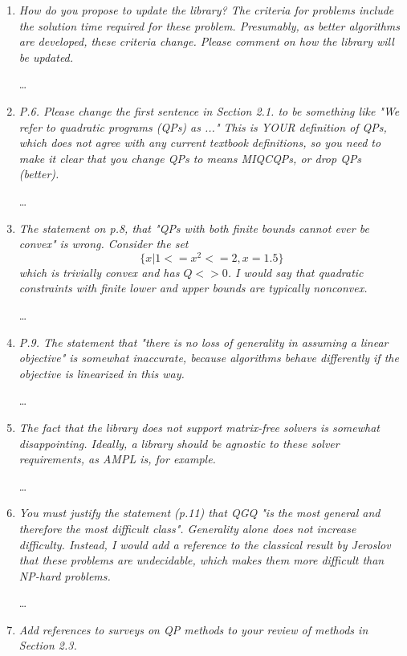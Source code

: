 \documentclass[11pt]{article}
\newcommand{\rep}[1]{{\textcolor{acblue}{#1}}}
\begin{document}
 \begin{enumerate}
 
 
\item 
{\it
 How do you propose to update the library? The criteria for problems include 
the solution time required for these problem. Presumably, as better algorithms 
are developed, these criteria change. Please comment on how the library will 
be updated. 
}

\rep{\dots}

\item 
{\it
 P.6. Please change the first sentence in Section 2.1. to be something like 
"We refer to quadratic programs (QPs) as ..." This is YOUR definition of QPs, 
which does not agree with any current textbook definitions, so you need to 
make it clear that you change QPs to means MIQCQPs, or drop QPs (better). 
}

\rep{\dots}

\item 
{\it
 The statement on p.8, that "QPs with both finite bounds cannot ever be convex" 
is wrong. Consider the set $$\{ x | 1 <= x^2 <= 2, x=1.5\}$$ which is trivially 
convex and has $Q<>0$. I would say that quadratic constraints with finite lower 
and upper bounds are typically nonconvex. 
}

\rep{\dots}

\item 
{\it
 P.9. The statement that "there is no loss of generality in assuming a linear 
objective" is somewhat inaccurate, because algorithms behave differently if 
the objective is linearized in this way. 
}

\rep{\dots}

\item 
{\it
 The fact that the library does not support matrix-free solvers is somewhat 
disappointing. Ideally, a library should be agnostic to these solver requirements, 
as AMPL is, for example. 
}

\rep{\dots}

\item 
{\it
 You must justify the statement (p.11) that QGQ "is the most general and therefore 
the most difficult class". Generality alone does not increase difficulty. Instead, 
I would add a reference to the classical result by Jeroslov that these problems 
are undecidable, which makes them more difficult than NP-hard problems. 
}

\rep{\dots}

\item 
{\it
 Add references to surveys on QP methods to your review of methods in Section 2.3. 
}


\end{enumerate}
\end{document}
